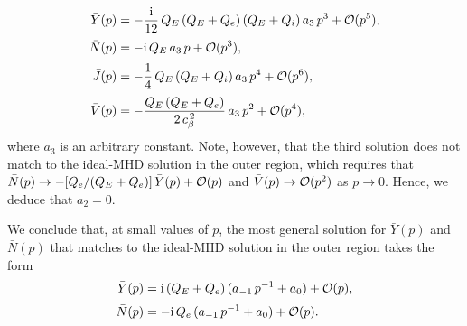 \documentclass[12pt,prb,aps]{revtex4-1}
\begin{document}
\begin{align}
\bar{Y}(p)& =- \frac{{\rm i}}{12}\,Q_E \,(Q_E+Q_e)\,(Q_E+Q_i)\,a_3\,p^3+{\cal O}(p^5),\\[0.5ex]
\bar{N}(p) &=-{\rm i}\, Q_E\,a_3\,p+{\cal O}(p^3),\\[0.5ex]
\bar{J}(p)&= -\frac{1}{4}\,Q_E\,(Q_E+Q_i)\,a_3\,p^4+{\cal O}(p^6),\\[0.5ex]
\bar{V}(p) &=- \frac{Q_E\,(Q_E+Q_e)}{2\,c_\beta^{\,2}}\,a_3\,p^2+{\cal O}(p^4),
\end{align}
where $a_3$ is an arbitrary constant. Note, however, that the third solution does not match to the ideal-MHD solution in the outer region, which requires that 
$\bar{N}(p) \rightarrow- [Q_e/(Q_E+Q_e)]\,\bar{Y}(p) + {\cal O}(p)$ and  $\bar{V}(p)\rightarrow {\cal O}(p^2)$
as $p\rightarrow 0$. Hence, we deduce that $a_2=0$. 

We conclude that, at small values of $p$, the most general solution for $\bar{Y}(p)$ and $\bar{N}(p)$ that matches to the ideal-MHD solution in the outer region  takes the form 
\begin{align}\label{yy}
\bar{Y}(p) &= {\rm i}\,(Q_E+Q_e)\,(a_{-1} \,p^{-1}+a_0)+ {\cal O}(p),\\[0.5ex]
\bar{N}(p) &= -{\rm i}\,Q_e\,(a_{-1}\,p^{-1} +a_0)+ {\cal O}(p).\label{nn}
\end{align}
\end{document}
